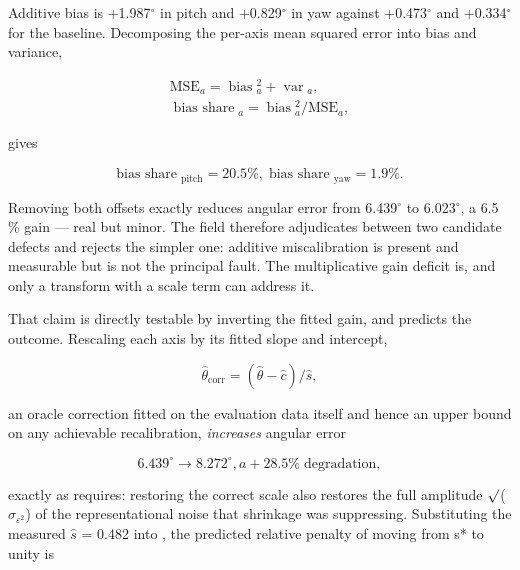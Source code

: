 Additive bias is +1.987$^{\circ}$ in pitch and +0.829$^{\circ}$ in yaw against +0.473$^{\circ}$ and +0.334$^{\circ}$ for the baseline. Decomposing the per-axis mean squared error into bias and variance,

\begin{equation}
\label{eq:195}
\begin{aligned}
\mathrm{MSE}_a = \;\text{bias}\;_a^{2} + \;\text{var}\;_a , \\
\;\text{bias share}\;_a = \;\text{bias}\;_a^{2} / \mathrm{MSE}_a ,
\end{aligned}
\end{equation}

gives

\begin{equation}
\label{eq:196}
\text{bias share}\;_{\mathrm{pitch}} = 20.5 \% , \;\text{bias share}\;_{\mathrm{yaw}} = 1.9 \% .
\end{equation}

Removing both offsets exactly reduces angular error from 6.439$^{\circ}$ to 6.023$^{\circ}$, a 6.5 \% gain --- real but minor. The field therefore adjudicates between two candidate defects and rejects the simpler one: additive miscalibration is present and measurable but is not the principal fault. The multiplicative gain deficit is, and only a transform with a scale term can address it.

That claim is directly testable by inverting the fitted gain, and  predicts the outcome. Rescaling each axis by its fitted slope and intercept,

\begin{equation}
\label{eq:197}
\hat{\theta }_{\mathrm{corr}} = ( \hat{\theta } - \hat{c} ) / \hat{s} ,
\end{equation}

an oracle correction fitted on the evaluation data itself and hence an upper bound on any achievable recalibration, \emph{increases} angular error

\begin{equation}
\label{eq:198}
6.439^{\circ} \to 8.272^{\circ} , a +28.5 \% \;\text{degradation} ,
\end{equation}

exactly as  requires: restoring the correct scale also restores the full amplitude $\surd$($\sigma_{\varepsilon^{2}}$) of the representational noise that shrinkage was suppressing. Substituting the measured $\hat{s}$ = 0.482 into , the predicted relative penalty of moving from s* to unity is

